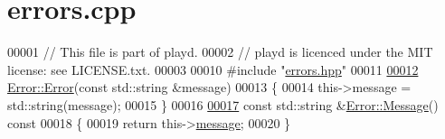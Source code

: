 \hypertarget{errors_8cpp_source}{\section{errors.\+cpp}
\label{errors_8cpp_source}
}

\begin{DoxyCode}
00001 \textcolor{comment}{// This file is part of playd.}
00002 \textcolor{comment}{// playd is licenced under the MIT license: see LICENSE.txt.}
00003 
00010 \textcolor{preprocessor}{#include "\hyperlink{errors_8hpp}{errors.hpp}"}
00011 
\hypertarget{errors_8cpp_source_l00012}{}\hyperlink{classError_accd611f3ddae0828adeb6ca251113ffd}{00012} \hyperlink{classError_accd611f3ddae0828adeb6ca251113ffd}{Error::Error}(\textcolor{keyword}{const} std::string &message)
00013 \{
00014     this->message = std::string(message);
00015 \}
00016 
\hypertarget{errors_8cpp_source_l00017}{}\hyperlink{classError_a006605b13a346cf019f60420f1b29b5a}{00017} \textcolor{keyword}{const} std::string &\hyperlink{classError_a006605b13a346cf019f60420f1b29b5a}{Error::Message}()\textcolor{keyword}{ const}
00018 \textcolor{keyword}{}\{
00019     \textcolor{keywordflow}{return} this->\hyperlink{classError_aa4713ef3ee9c3c0da43a54b01949510d}{message};
00020 \}
\end{DoxyCode}
